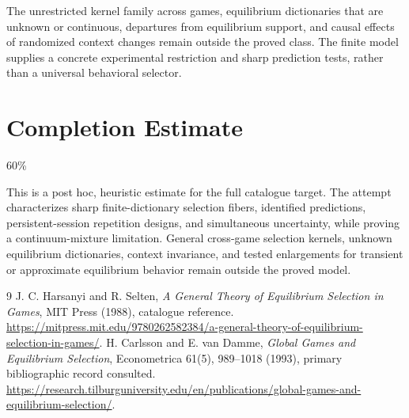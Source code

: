 \documentclass[11pt]{article}
\theoremstyle{remark}
\begin{document}
The unrestricted kernel family across games, equilibrium dictionaries that are unknown or continuous, departures from equilibrium support, and causal effects of randomized context changes remain outside the proved class. The finite model supplies a concrete experimental restriction and sharp prediction tests, rather than a universal behavioral selector.

\section{Completion Estimate}
60\%

This is a post hoc, heuristic estimate for the full catalogue target.
The attempt characterizes sharp finite-dictionary selection fibers, identified predictions, persistent-session repetition designs, and simultaneous uncertainty, while proving a continuum-mixture limitation. General cross-game selection kernels, unknown equilibrium dictionaries, context invariance, and tested enlargements for transient or approximate equilibrium behavior remain outside the proved model.

\begin{thebibliography}{9}
 J. C. Harsanyi and R. Selten, \emph{A General Theory of Equilibrium Selection in Games}, MIT Press (1988), catalogue reference. \url{https://mitpress.mit.edu/9780262582384/a-general-theory-of-equilibrium-selection-in-games/}.
 H. Carlsson and E. van Damme, \emph{Global Games and Equilibrium Selection}, Econometrica 61(5), 989--1018 (1993), primary bibliographic record consulted. \url{https://research.tilburguniversity.edu/en/publications/global-games-and-equilibrium-selection/}.
\end{thebibliography}
\end{document}
